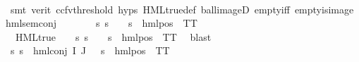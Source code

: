 \begin{isabellebody}
\ \ \ \ \isamarkupfalse%
\ {\isacharparenleft}{\kern0pt}smt\ {\isacharparenleft}{\kern0pt}verit{\isacharcomma}{\kern0pt}\ ccfv{\isacharunderscore}{\kern0pt}threshold{\isacharparenright}{\kern0pt}\ {\isachardoublequoteopen}{}{\isachardot}{\kern0pt}hyps{\isachardoublequoteclose}\ HML{\isacharunderscore}{\kern0pt}true{\isacharunderscore}{\kern0pt}def\ ball{\isacharunderscore}{\kern0pt}imageD\ empty{\isacharunderscore}{\kern0pt}iff\ empty{\isacharunderscore}{\kern0pt}is{\isacharunderscore}{\kern0pt}image\ hml{\isacharunderscore}{\kern0pt}sem{\isacharunderscore}{\kern0pt}conj{\isacharparenright}{\kern0pt}\isanewline
\ \ \isamarkupfalse%
\ \isamarkupfalse%
\ {\isasymalpha}\ \ {\isachardoublequoteopen}{\isasymforall}s{\isachardot}{\kern0pt}\ {\isacharparenleft}{\kern0pt}s\ {\isasymTurnstile}\ {\isasymphi}{\isacharparenright}{\kern0pt}\ {\isacharequal}{\kern0pt}\ {\isacharparenleft}{\kern0pt}s\ {\isasymTurnstile}\ hml{\isacharunderscore}{\kern0pt}pos\ {\isasymalpha}\ TT{\isacharparenright}{\kern0pt}{\isachardoublequoteclose}\ \isanewline
\ \ \ \ \isamarkupfalse%
\ {\isacartoucheopen}{\isasymnot}\ HML{\isacharunderscore}{\kern0pt}true\ {\isasymphi}\ {\isasymlongrightarrow}\ {\isacharparenleft}{\kern0pt}{\isasymexists}{\isasymalpha}{\isachardot}{\kern0pt}\ {\isasymforall}s{\isachardot}{\kern0pt}\ {\isacharparenleft}{\kern0pt}s\ {\isasymTurnstile}\ {\isasymphi}{\isacharparenright}{\kern0pt}\ {\isacharequal}{\kern0pt}\ {\isacharparenleft}{\kern0pt}s\ {\isasymTurnstile}\ hml{\isacharunderscore}{\kern0pt}pos\ {\isasymalpha}\ TT{\isacharparenright}{\kern0pt}{\isacharparenright}{\kern0pt}{\isacartoucheclose}\ \isamarkupfalse%
\ blast\isanewline
\ \ \isamarkupfalse%
\ {\isachardoublequoteopen}{\isasymforall}s{\isachardot}{\kern0pt}\ {\isacharparenleft}{\kern0pt}s\ {\isasymTurnstile}\ hml{\isacharunderscore}{\kern0pt}conj\ I\ J\ {\isasymPhi}{\isacharparenright}{\kern0pt}\ {\isacharequal}{\kern0pt}\ {\isacharparenleft}{\kern0pt}s\ {\isasymTurnstile}\ hml{\isacharunderscore}{\kern0pt}pos\ {\isasymalpha}\ TT{\isacharparenright}{\kern0pt}{\isachardoublequoteclose}\ \isanewline
\ \ \ \ \isamarkupfalse%

\end{isabellebody}
